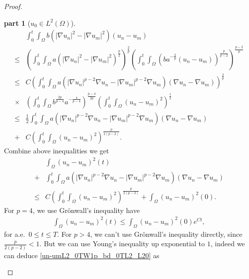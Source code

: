 \documentclass[11pt]{amsart}
\theoremstyle{definition}
\newtheorem{proofpart}{part}
\numberwithin{equation}{section}
\newcommand*\abs[1]{\lvert#1\rvert}
\begin{document}
\begin{proof}
\begin{proofpart}[$u_0 \in L^2(\Omega)$]
\begin{equation}
\begin{split}
			& \int_{0}^{t}\int_{\Omega}b\left(\abs{\nabla u_n}^2
			- \abs{\nabla u_m}^2\right)\left(u_n - u_m\right)\\
			\leq{} & \left(\int_0^t\int_{\Omega}a\left(\abs{\nabla u_n}^2
			- \abs{\nabla u_m}^2\right)^{\frac{p}{2}}\right)^{\frac{2}{p}}
			\left(\int_0^t\int_{\Omega}\left(ba^{-\frac{2}{p}}
			\left(u_n-u_m\right)\right)^{\frac{p}{p-2}}\right)^{\frac{p-2}{p}}\\
			\leq{} & C\left(\int_0^t\int_{\Omega}a
			\left(\abs{\nabla u_n}^{p-2}\nabla u_n
			- \abs{\nabla u_m}^{p-2}\nabla u_m\right)
			\left(\nabla u_n - \nabla u_m\right)\right)^{\frac{2}{p}}\\
			\times{} & \left(\int_0^t\int_{\Omega}b^{\frac{2p}{p-4}}a^{-\frac{4}{p-4}}\right)^{\frac{p-4}{2p}}
			\left(\int_0^t\int_{\Omega}\left(u_n-u_m\right)^2\right)^{\frac{1}{2}}\\
			\leq{} & \frac{1}{2}\int_0^t\int_{\Omega}a
			\left(\abs{\nabla u_n}^{p-2}\nabla u_n
			- \abs{\nabla u_m}^{p-2}\nabla u_m\right)
			\left(\nabla u_n - \nabla u_m\right)\\
			+{} & C\left(\int_0^t\int_{\Omega}\left(u_n-u_m\right)^2\right)^{\frac{p}{2(p-2)}}.
		\end{split}
	\end{equation}
	Combine above inequalities we get
	\begin{equation}\label{un-umL2_0TW1p_bd_0TL2_L20}
		\begin{split}
			& \int_{\Omega}\left(u_n-u_m\right)^2(t)\\
			+{} & \int_{0}^{t}\int_{\Omega}a
			\left(\abs{\nabla u_n}^{p-2}\nabla u_n
			- \abs{\nabla u_m}^{p-2}\nabla u_m\right)
			\left(\nabla u_n - \nabla u_m\right)\\
			\leq{} & C\left(\int_0^t\int_{\Omega}
			\left(u_n-u_m\right)^2\right)^{\frac{p}{2(p-2)}}
			+ \int_{\Omega}\left(u_n-u_m\right)^2(0).
		\end{split}
	\end{equation}
	For $p=4$, we use Gr\"onwall's inequality have
	\begin{equation}
		\begin{split}
			\int_{\Omega}\left( u_n-u_m \right)^2(t)
			\leq \int_{\Omega}\left(u_n-u_m\right)^2(0)e^{Ct} ,
		\end{split}
	\end{equation}
	for a.e.\ $0 \leq t \leq T$. For $p>4$,
	we can't use Gr\"onwall's inequality directly,
	since $\frac{p}{2(p-2)}<1$. But we can use Young's inequality up
	exponential to $1$,
	indeed we can deduce \cref{un-umL2_0TW1p_bd_0TL2_L20} as

\end{proofpart}
\end{proof}
\end{document}
